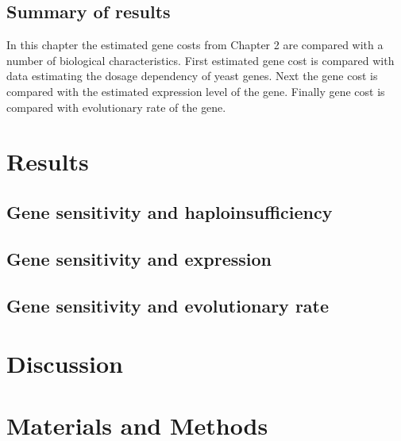 \subsection{Summary of results}

In this chapter the estimated gene costs from Chapter 2 are compared with a number of biological characteristics. First estimated gene cost is compared with data estimating the dosage dependency of yeast genes. Next the gene cost is compared with the estimated expression level of the gene. Finally gene cost is compared with evolutionary rate of the gene.

\section{Results}

\subsection{Gene sensitivity and haploinsufficiency}

\subsection{Gene sensitivity and expression}

\subsection{Gene sensitivity and evolutionary rate}

\section{Discussion}

\section{Materials and Methods}
